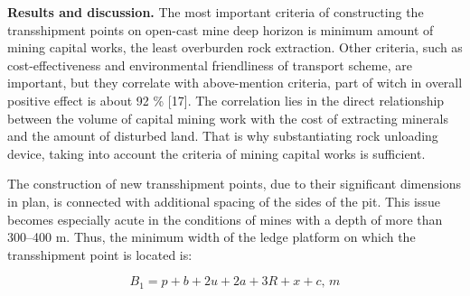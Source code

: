 \begin{multicols}{2}
{\bfseries Results and discussion.} The most important criteria of
constructing the transshipment points on open-cast mine deep horizon is
minimum amount of mining capital works, the least overburden rock
extraction. Other criteria, such as cost-effectiveness and environmental
friendliness of transport scheme, are important, but they correlate with
above-mention criteria, part of witch in overall positive effect is
about 92 \% {[}17{]}. The correlation lies in the direct relationship
between the volume of capital mining work with the cost of extracting
minerals and the amount of disturbed land. That is why substantiating
rock unloading device, taking into account the criteria of mining
capital works is sufficient.

The construction of new transshipment points, due to their significant
dimensions in plan, is connected with additional spacing of the sides of
the pit. This issue becomes especially acute in the conditions of mines
with a depth of more than 300--400 m. Thus, the minimum width of the
ledge platform on which the transshipment point is located is:
\end{multicols}

\begin{equation}
B_{1} = p + b + 2u + 2a + 3R + x + c, \, m
\end{equation}


